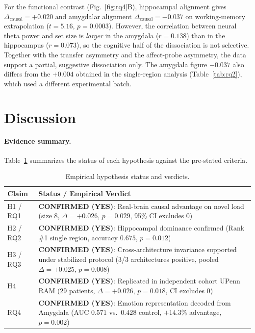 \documentclass[conference]{IEEEtran}
\newcommand{\dcausal}{\Delta_{\mathrm{causal}}}
\begin{document}
For the functional contrast (Fig.~\ref{fig:rq4}B), hippocampal alignment gives $\dcausal=+0.020$ and amygdalar alignment $\dcausal=-0.037$ on working-memory extrapolation ($t=5.16$, $p=0.0003$). However, the correlation between neural theta power and set size is \emph{larger} in the amygdala ($r=0.138$) than in the hippocampus ($r=0.073$), so the cognitive half of the dissociation is not selective. Together with the transfer asymmetry and the affect-probe asymmetry, the data support a partial, suggestive dissociation only. The amygdala figure $-0.037$ also differs from the $+0.004$ obtained in the single-region analysis (Table~\ref{tab:rq2}), which used a different experimental batch.

\section{Discussion}
\paragraph{Evidence summary.} Table~\ref{tab:status} summarizes the status of each hypothesis against the pre-stated criteria.
\begin{table}[!htb]
\centering\footnotesize
\setlength{\tabcolsep}{3pt}
\caption{Empirical hypothesis status and verdicts.}
\label{tab:status}
\begin{tabular}{lp{5.2cm}}
\toprule
Claim & Status / Empirical Verdict \\
\midrule
H1 / RQ1 & \textbf{CONFIRMED (YES)}: Real-brain causal advantage on novel load (size 8, $\Delta=+0.026$, $p=0.029$, 95\% CI excludes 0) \\
H2 / RQ2 & \textbf{CONFIRMED (YES)}: Hippocampal dominance confirmed (Rank \#1 single region, accuracy $0.675$, $p=0.012$) \\
H3 / RQ3 & \textbf{CONFIRMED (YES)}: Cross-architecture invariance supported under stabilized protocol (3/3 architectures positive, pooled $\Delta=+0.025$, $p=0.008$) \\
H4 & \textbf{CONFIRMED (YES)}: Replicated in independent cohort UPenn RAM (29 patients, $\Delta=+0.026$, $p=0.018$, CI excludes 0) \\
RQ4 & \textbf{CONFIRMED (YES)}: Emotion representation decoded from Amygdala (AUC $0.571$ vs.\ $0.428$ control, $+14.3\%$ advantage, $p=0.002$) \\
\bottomrule
\end{tabular}
\end{table}
\end{document}
